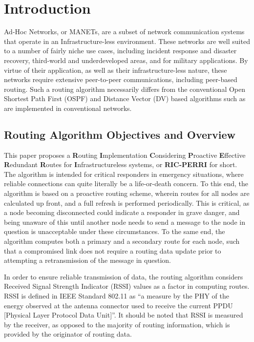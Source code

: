 \section{Introduction}\label{sec:introduction}
 Ad-Hoc Networks, or MANETs, are a subset of network communication systems that operate in an Infrastructure-less environment. These networks are well suited to a number of fairly niche use cases, including incident response and disaster recovery, third-world and underdeveloped areas, and for military applications. By virtue of their application, as well as their infrastructure-less nature, these networks require extensive peer-to-peer communications, including peer-based routing. Such a routing algorithm necessarily differs from the conventional Open Shortest Path First (OSPF) and Distance Vector (DV) based algorithms such as are implemented in conventional networks.

\subsection{Routing Algorithm Objectives and Overview}\label{subsec:objectives}

This paper proposes a \textbf{R}outing \textbf{I}mplementation \textbf{C}onsidering \textbf{P}roactive \textbf{E}ffective \textbf{R}edundant \textbf{R}outes for \textbf{I}nfrastructureless systems, or \textbf{RIC-PERRI} \cite{perry_rp_2022} for short. The algorithm is intended for critical responders in emergency situations, where reliable connections can quite literally be a life-or-death concern. To this end, the algorithm is based on a proactive routing scheme, wherein routes for all nodes are calculated up front, and a full refresh is performed periodically. This is critical, as a node becoming disconnected could indicate a responder in grave danger, and being unaware of this until another node needs to send a message to the node in question is unacceptable under these circumstances. To the same end, the algorithm computes both a primary and a secondary route for each node, such that a compromised link does not require a routing data update prior to attempting a retransmission of the message in question. 

In order to ensure reliable transmission of data, the routing algorithm considers Received Signal Strength Indicator (RSSI) values as a factor in computing routes. RSSI is defined in IEEE Standard 802.11 as ``a measure by the PHY of the energy observed at the antenna connector used to receive the current PPDU [Physical Layer Protocol Data Unit]''\cite{lanman_standards_committee_80211-2020_2021}. It should be noted that RSSI is measured by the receiver, as opposed to the majority of routing information, which is provided by the originator of routing data.


